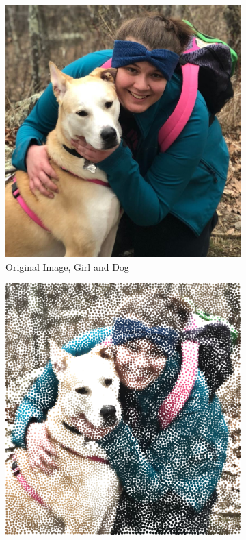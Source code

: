 \documentclass[11pt]{article}
\begin{document}
\begin{figure}[H]
	\centering
	\begin{subfigure}[b]{.52\linewidth}
		\includegraphics[width=\linewidth]{Emilee-And-Lola}
		\caption{Original Image, Girl and Dog}
		\label{fig:gff}
	\end{subfigure}
	\begin{subfigure}[b]{.48\linewidth}
		\includegraphics[width=\linewidth]{Emilee-And-Lola-IntensityScaled2-10000}

\end{subfigure}
\end{figure}
\end{document}
